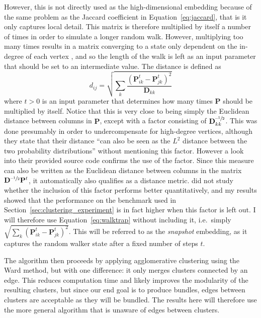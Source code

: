 However, this is not directly used as the high-dimensional embedding because of the same problem as the Jaccard coefficient in Equation~\eqref{eq:jaccard}, that is it only captures local detail. This matrix is therefore multiplied by itself a number of times in order to simulate a longer random walk. However, multiplying too many times results in a matrix converging to a state only dependent on the in-degree of each vertex \cite{Pons2006}, and so the length of the walk is left as an input parameter that should be set to an intermediate value.
The distance is defined as
\begin{equation}
    d_{ij} = \sqrt{\sum_{k}\frac{(\mathbf{P}_{ik}^t - \mathbf{P}_{jk}^t)^2}{\mathbf{D}_{kk}}}
    \label{eq:walktrap}
\end{equation}
where $t>0$ is an input parameter that determines how many times $\mathbf{P}$ should be multiplied by itself.
Notice that this is very close to being simply the Euclidean distance between columns in $\mathbf{P}$, except with a factor consisting of $\mathbf{D}_{kk}^{\text{--}\sfrac{1}{2}}$. This was done presumably in order to undercompensate for high-degree vertices, although they state that their distance ``can also be seen as the $L^2$ distance between the two probability distributions'' \cite{Pons2006} without mentioning this factor. However a look into their provided source code confirms the use of the factor.
Since this measure can also be written as the Euclidean distance between columns in the matrix $\mathbf{D}^{\text{--}\sfrac{1}{2}}\mathbf{P}^t$, it automatically also qualifies as a distance metric.
\cite{Pons2006} did not study whether the inclusion of this factor performs better quantitatively, and my results showed that the performance on the benchmark used in Section~\ref{sec:clustering_experiment} is in fact higher when this factor is left out. I will therefore use Equation~\eqref{eq:walktrap} without including it, i.e.\ simply $\sqrt{\sum_{k}(\mathbf{P}_{ik}^t - \mathbf{P}_{jk}^t)^2}$. This will be referred to as the \emph{snapshot} embedding, as it captures the random walker state after a fixed number of steps $t$.

The algorithm then proceeds by applying agglomerative clustering using the Ward method, but with one difference: it only merges clusters connected by an edge. This reduces computation time and likely improves the modularity of the resulting clusters, but since our end goal is to produce bundles, edges between clusters are acceptable as they will be bundled. The results here will therefore use the more general algorithm that is unaware of edges between clusters.

